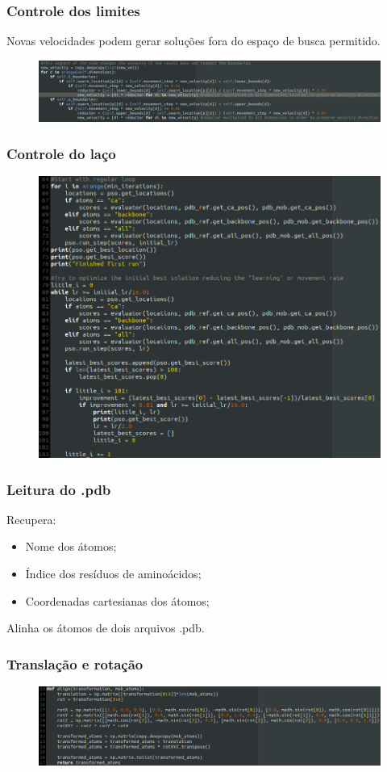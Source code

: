 \documentclass{beamer}
\begin{document}
\begin{frame}
\frametitle{Controle dos limites}
Novas velocidades podem gerar soluções fora do espaço de busca permitido.
\begin{figure}
\includegraphics[width=1.0\linewidth]{pylimit.png}
\end{figure}
\end{frame}

\begin{frame}
\frametitle{Controle do laço}
\begin{figure}
\includegraphics[width=0.8\linewidth]{pyloop.png}
\end{figure}
\end{frame}

\begin{frame}
\frametitle{Leitura do .pdb}
Recupera:
\begin{itemize}
\item Nome dos átomos;
\item Índice dos resíduos de aminoácidos;
\item Coordenadas cartesianas dos átomos;
\end{itemize}
Alinha os átomos de dois arquivos .pdb.
\end{frame}

\begin{frame}
\frametitle{Translação e rotação}
\begin{figure}
\includegraphics[width=1.0\linewidth]{pyrot.png}
\end{figure}
\end{frame}
\end{document}
